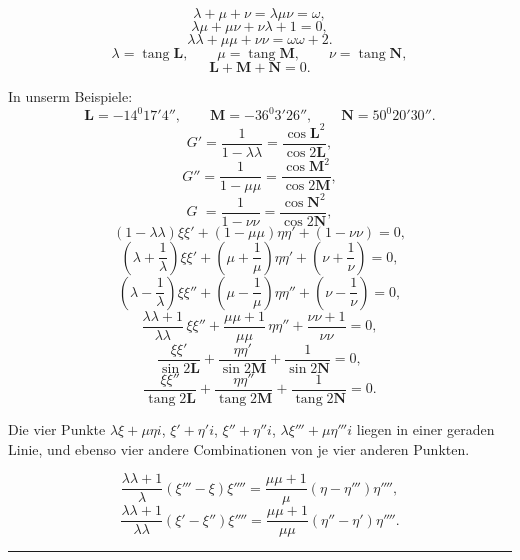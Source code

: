 
\[
\lambda+\mu+\nu=\lambda\mu\nu=\omega,
\]
\[
\lambda\mu+\mu\nu+\nu\lambda+1=0,
\]
\[
\lambda\lambda+\mu\mu+\nu\nu=\omega\omega+2.
\]
\[
\lambda=\operatorname{tang}\boldsymbol{L}, \qquad \mu=\operatorname{tang}\boldsymbol{M}, \qquad \nu=\operatorname{tang}\boldsymbol{N},
\]
\[
\boldsymbol{L}+\boldsymbol{M}+\boldsymbol{N}=0.
\]

In unserm Beispiele:
\[
\boldsymbol{L}=-14^{0}17'4'', \qquad \boldsymbol{M}=-36^{0}3'26'', \qquad \boldsymbol{N}=50^{0}20'30''.
\]
\[
G'=\frac{1}{1-\lambda\lambda}=\frac{\cos \boldsymbol{L}^{2}}{\cos 2\boldsymbol{L}},
\]
\[
G''=\frac{1}{1-\mu\mu}=\frac{\cos \boldsymbol{M}^{2}}{\cos 2\boldsymbol{M}},
\]
\[
G\phantom{'}=\frac{1}{1-\nu\nu}=\frac{\cos \boldsymbol{N}^{2}}{\cos 2\boldsymbol{N}},
\]
\[
(1-\lambda\lambda)\xi\xi'+(1-\mu\mu)\eta\eta'+(1-\nu\nu)=0,
\]
\[
\left(\lambda+\frac{1}{\lambda}\right)\xi\xi'+\left(\mu+\frac{1}{\mu}\right)\eta\eta'+\left(\nu+\frac{1}{\nu}\right)=0,
\]
\[
\left(\lambda-\frac{1}{\lambda}\right)\xi\xi''+\left(\mu-\frac{1}{\mu}\right)\eta\eta''+\left(\nu-\frac{1}{\nu}\right)=0,
\]
\[
\frac{\lambda\lambda+1}{\lambda\lambda}\,\xi\xi''+\frac{\mu\mu+1}{\mu\mu}\,\eta\eta''+\frac{\nu\nu+1}{\nu\nu}=0,
\]
\[
\frac{\xi\xi'}{\sin 2\boldsymbol{L}}+\frac{\eta\eta'}{\sin 2\boldsymbol{M}}+\frac{1}{\sin 2\boldsymbol{N}}=0,
\]
\[
\frac{\xi\xi''}{\operatorname{tang} 2\boldsymbol{L}}+\frac{\eta\eta''}{\operatorname{tang} 2\boldsymbol{M}}+\frac{1}{\operatorname{tang} 2\boldsymbol{N}}=0.
\]

Die vier Punkte $\lambda\xi+\mu\eta i$, $\xi'+\eta'i$, $\xi''+\eta''i$, $\lambda\xi'''+\mu\eta'''i$ liegen in einer geraden
Linie, und ebenso vier andere Combinationen von je vier anderen Punkten.

\[
\frac{\lambda\lambda+1}{\lambda}(\xi'''-\xi)\xi''''=\frac{\mu\mu+1}{\mu}(\eta-\eta''')\eta'''',
\]
\[
\frac{\lambda\lambda+1}{\lambda\lambda}(\xi'-\xi'')\xi''''=\frac{\mu\mu+1}{\mu\mu}(\eta''-\eta')\eta''''.
\]

\begin{center}\rule{3cm}{.4pt}\end{center}
